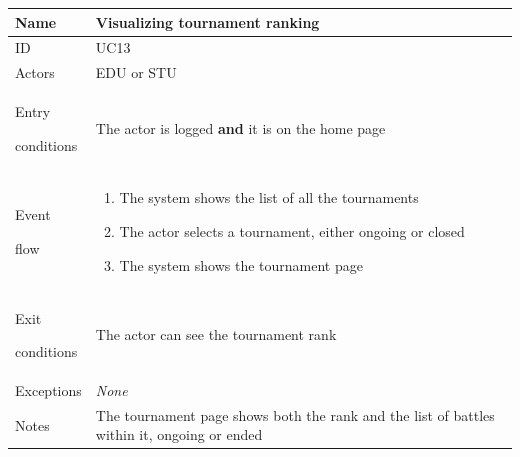 \begin{center}
    \def\arraystretch{1.5}
    \begin{tabular}{| m{2cm} | m{10cm}|}
        \hline
        Name                  & Visualizing tournament ranking                                                              \\ \hline
        ID                    & UC13                                                                                        \\ \hline
        Actors                & EDU or STU                                                                                  \\ \hline
        Entry \par conditions & The actor is logged \textbf{and} it is on the home page                                     \\ \hline
        Event \par flow       & \begin{enumerate}
                                    \item The system shows the list of all the tournaments
                                    \item The actor selects a tournament, either ongoing or closed
                                    \item The system shows the tournament page
                                \end{enumerate}                               \\ \hline
        Exit \par conditions  & The actor can see the tournament rank                                                       \\ \hline
        Exceptions            & \textit{None}                                                                               \\ \hline
        Notes                 & The tournament page shows both the rank and the list of battles within it, ongoing or ended \\ \hline
    \end{tabular}
\end{center}

